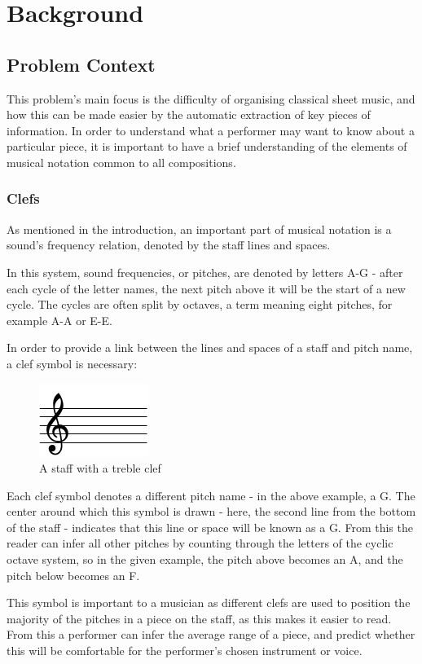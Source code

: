 \section{Background}
\subsection{Problem Context}
This problem's main focus is the difficulty of organising classical sheet music, and how this can be made easier by the automatic extraction of key pieces  of information. In order to understand what a performer may want to know about a particular piece, it is important to have a brief understanding of the elements of musical notation common to all compositions.
\subsubsection{Clefs}
As mentioned in the introduction, an important part of musical notation is a sound's frequency relation, denoted by the staff lines and spaces. 

In this system, sound frequencies, or pitches, are denoted by letters A-G - after each cycle of the letter names, the next pitch above it will be the start of a new cycle. The cycles are often split by octaves, a term meaning eight pitches, for example A-A or E-E. 

In order to provide a link between the lines and spaces of a staff and pitch name, a clef symbol is necessary:
\begin{figure}[htbp]
    \centering
        \includegraphics{clef-crop.pdf}
    \caption{A staff with a treble clef}
\end{figure}

Each clef symbol denotes a different pitch name - in the above example, a G. The center around which this symbol is drawn - here, the second line from the bottom of the staff - indicates that this line or space will be known as a G. From this the reader can infer all other pitches by counting through the letters of the cyclic octave system, so in the given example, the pitch above becomes an A, and the pitch below becomes an F.

This symbol is important to a musician as different clefs are used to position the majority of the pitches in a piece on the staff, as this makes it easier to read. From this a performer can infer the average range of a piece, and predict whether this will be comfortable for the performer's chosen instrument or voice.

